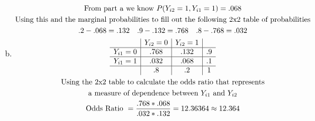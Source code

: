 \documentclass{article}
\newcommand{\ya}{Y_{i1}}
\newcommand{\yb}{Y_{i2}}
\begin{document}
\begin{flushleft}
\begin{enumerate}[(a)]
\begin{multline*}
\end{multline*}
\item
\begin{multline*}\\
\text{From part a we know } P(\yb=1,\ya=1)=.068\\
\text{Using this and the marginal probabilities to fill out the following 2x2 table of probabilities}\\
.2-.068=.132 \quad .9-.132=.768 \quad .8-.768=.032\\
\begin{array}{c|c|c|c}
&\yb=0 &\yb=1 &\\
\hline
\ya=0&.768&.132&.9\\
\hline
\ya=1&.032&.068&.1\\
\hline
&.8&.2&1
\end{array}\\
\text{Using the 2x2 table to calculate the odds ratio that represents}\\
\text{a measure of dependence between } \ya \text{ and } \yb\\
\text{Odds Ratio }=\dfrac{.768*.068}{.032*.132}=12.36364\approx 12.364\\
\end{multline*}
\end{enumerate}
\end{flushleft}
\end{document}
